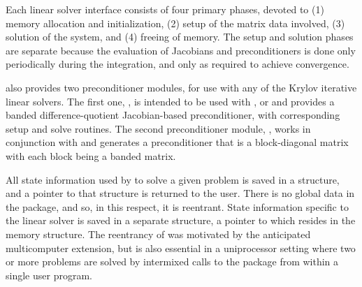 Each {\cvode} linear solver interface consists of four primary phases,
devoted to (1) memory allocation and initialization, (2) setup of the
matrix data involved, (3) solution of the system, and (4) freeing of memory.  
The setup and solution phases are separate because the evaluation of
Jacobians and preconditioners is done only periodically during the
integration, and only as required to achieve convergence. 

{\cvode} also provides two preconditioner modules, for use with any of
the Krylov iterative linear solvers. The first one, {\cvbandpre},
is intended to be used with {\nvecs}, {\nvecopenmp} or {\nvecpthreads}
and provides a banded difference-quotient Jacobian-based
preconditioner, with corresponding setup and solve routines.
The second preconditioner module, {\cvbbdpre}, works in conjunction
with {\nvecp} and generates a preconditioner that is a block-diagonal
matrix with each block being a banded matrix.

All state information used by {\cvode} to solve a given problem is saved
in a structure, and a pointer to that structure is returned to the
user.  There is no global data in the {\cvode} package, and so, in this
respect, it is reentrant. State information specific to the linear
solver is saved in a separate structure, a pointer to which resides in
the {\cvode} memory structure. The reentrancy of {\cvode} was motivated
by the anticipated multicomputer extension, but is also essential
in a uniprocessor setting where two or more problems are solved by
intermixed calls to the package from within a single user program.
